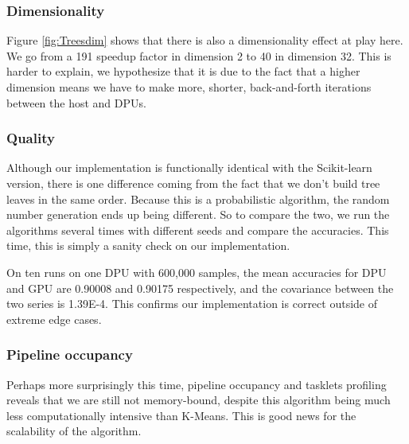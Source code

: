 \subsubsection{Dimensionality}

Figure \ref{fig:Treesdim} shows that there is also a dimensionality effect at play here. We go from a 191 speedup factor in dimension 2 to 40 in dimension 32. This is harder to explain, we hypothesize that it is due to the fact that a higher dimension means we have to make more, shorter, back-and-forth iterations between the host and DPUs.

\subsubsection{Quality}

Although our implementation is functionally identical with the Scikit-learn version, there is one difference coming from the fact that we don't build tree leaves in the same order. Because this is a probabilistic algorithm, the random number generation ends up being different. So to compare the two, we run the algorithms several times with different seeds and compare the accuracies. This time, this is simply a sanity check on our implementation.

On ten runs on one DPU with 600,000 samples, the mean accuracies for DPU and GPU are 0.90008 and 0.90175 respectively, and the covariance between the two series is 1.39E-4. This confirms our implementation is correct outside of extreme edge cases.

\subsubsection{Pipeline occupancy}

Perhaps more surprisingly this time, pipeline occupancy and tasklets profiling reveals that we are still not memory-bound, despite this algorithm being much less computationally intensive than K-Means. This is good news for the scalability of the algorithm.